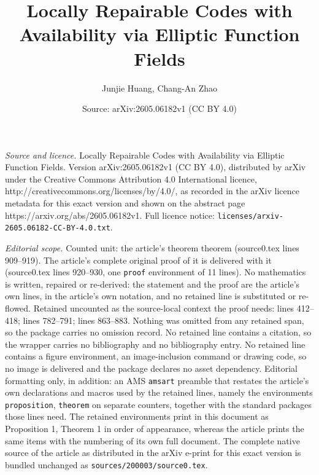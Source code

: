 \documentclass[10pt,a4paper]{amsart}
\title{Locally Repairable Codes with Availability via Elliptic Function Fields}
\author{Junjie Huang, Chang-An Zhao}
\date{Source: arXiv:2605.06182v1 (CC BY 4.0)}
\begin{document}
\maketitle

\noindent\emph{Source and licence.} Locally Repairable Codes with Availability via Elliptic Function Fields. Version arXiv:2605.06182v1 (CC BY 4.0), distributed by arXiv under the Creative Commons Attribution 4.0 International licence, http://creativecommons.org/licenses/by/4.0/, as recorded in the arXiv licence metadata for this exact version and shown on the abstract page https://arxiv.org/abs/2605.06182v1. Full licence notice: \texttt{licenses/arxiv-2605.06182-CC-BY-4.0.txt}.\par\smallskip

\noindent\textit{Editorial scope.} Counted unit: the article's theorem theorem (source0.tex lines 909--919). The article's complete original proof of it is delivered with it (source0.tex lines 920--930, one \texttt{proof} environment of 11 lines). No mathematics is written, repaired or re-derived: the statement and the proof are the article's own lines, in the article's own notation, and no retained line is substituted or re-flowed.  Retained uncounted as the source-local context the proof needs: lines 412--418; lines 782--791; lines 863--883.  Nothing was omitted from any retained span, so the package carries no omission record.  No retained line contains a citation, so the wrapper carries no bibliography and no bibliography entry.  No retained line contains a figure environment, an image-inclusion command or drawing code, so no image is delivered and the package declares no asset dependency.  Editorial formatting only, in addition: an AMS \texttt{amsart} preamble that restates the article's own declarations and macros used by the retained lines, namely the environments \texttt{proposition}, \texttt{theorem} on separate counters, together with the standard packages those lines need.  The retained environments print in this document as Proposition 1, Theorem 1 in order of appearance, whereas the article prints the same items with the numbering of its own full document.  The complete native source of the article as distributed in the arXiv e-print for this exact version is bundled unchanged as \texttt{sources/200003/source0.tex}.
\end{document}
